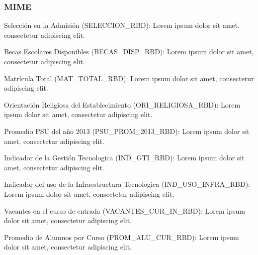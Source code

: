 \subsubsection{MIME}
\begin{longdescription}
     \item[Selección en la Admisión](SELECCION\_RBD):
     Lorem ipsum dolor sit amet, consectetur adipiscing elit.
     \item[Becas Escolares Disponibles](BECAS\_DISP\_RBD):
     Lorem ipsum dolor sit amet, consectetur adipiscing elit.
     \item[Matrícula Total](MAT\_TOTAL\_RBD):
     Lorem ipsum dolor sit amet, consectetur adipiscing elit.
     \item[Orientación Religiosa del Establecimiento](ORI\_RELIGIOSA\_RBD):
     Lorem ipsum dolor sit amet, consectetur adipiscing elit.
     \item[Promedio PSU del año 2013](PSU\_PROM\_2013\_RBD):
     Lorem ipsum dolor sit amet, consectetur adipiscing elit.
     \item[Indicador de la Gestión Tecnologica](IND\_GTI\_RBD):
     Lorem ipsum dolor sit amet, consectetur adipiscing elit.
     \item[Indicador del uso de la Infraestructura Tecnologica](IND\_USO\_INFRA\_RBD):
     Lorem ipsum dolor sit amet, consectetur adipiscing elit.
     \item[Vacantes en el curso de entrada](VACANTES\_CUR\_IN\_RBD):
     Lorem ipsum dolor sit amet, consectetur adipiscing elit.
     \item[Promedio de Alumnos por Curso](PROM\_ALU\_CUR\_RBD):
     Lorem ipsum dolor sit amet, consectetur adipiscing elit.
\end{longdescription}